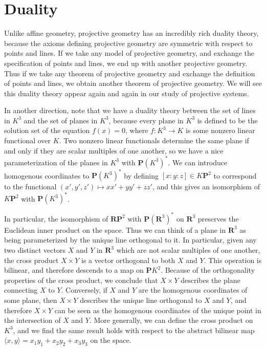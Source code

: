 \section{Duality}

Unlike affine geometry, projective geometry has an incredibly rich duality theory, because the axioms defining projective geometry are symmetric with respect to points and lines. If we take any model of projective geometry, and exchange the specification of points and lines, we end up with another projective geometry. Thus if we take any theorem of projective geometry and exchange the definition of points and lines, we obtain another theorem of projective geometry. We will see this duality theory appear again and again in our study of projective systems.

In another direction, note that we have a duality theory between the set of lines in $K^3$ and the set of planes in $K^3$, because every plane in $K^3$ is defined to be the solution set of the equation $f(x) = 0$, where $f: K^3 \to K$ is some nonzero linear functional over $K$. Two nonzero linear functionals determine the same plane if and only if they are scalar multiples of one another, so we have a nice parameterization of the planes in $K^3$ with $\mathbf{P}(K^3)^*$. We can introduce homogenous coordinates to $\mathbf{P}(K^3)^*$ by defining $[x:y:z] \in K\mathbf{P}^2$ to correspond to the functional $(x',y',z') \mapsto xx' + yy' + zz'$, and this gives an isomorphism of $K\mathbf{P}^2$ with $\mathbf{P}(K^3)^*$.

In particular, the isomorphism of $\mathbf{R}\mathbf{P}^2$ with $\mathbf{P}(\mathbf{R}^3)^*$ on $\mathbf{R}^3$ preserves the Euclidean inner product on the space. Thus we can think of a plane in $\mathbf{R}^3$ as being parameterized by the unique line orthogonal to it. In particular, given any two distinct vectors $X$ and $Y$ in $\mathbf{R}^3$ which are not scalar multiples of one another, the cross product $X \times Y$ is a vector orthogonal to both $X$ and $Y$. This operation is bilinear, and therefore descends to a map on $\mathbf{P}K^2$. Because of the orthogonality properties of the cross product, we conclude that $X \times Y$ describes the plane connecting $X$ to $Y$. Conversely, if $X$ and $Y$ are the homogenous coordinates of some plane, then $X \times Y$ describes the unique line orthogonal to $X$ and $Y$, and therefore $X \times Y$ can be seen as the homogenous coordinates of the unique point in the intersection of $X$ and $Y$. More generally, we can define the cross product on $K^3$, and we find the same result holds with respect to the abstract bilinear map $\langle x, y \rangle = x_1y_1 + x_2y_2 + x_3y_3$ on the space.

